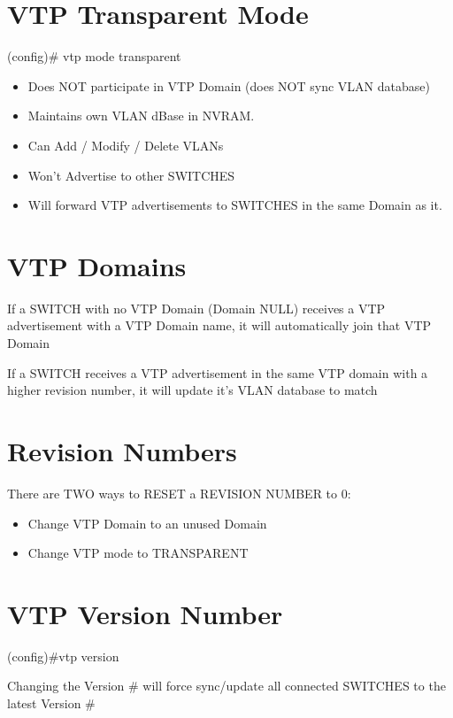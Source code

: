\section{VTP Transparent Mode}\label{vtp-transparent-mode}

\begin{tipbox}

(config)\# vtp mode transparent

\end{tipbox}

\begin{itemize}
\tightlist
\item
  Does NOT participate in VTP Domain (does NOT sync VLAN database)
\item
  Maintains own VLAN dBase in NVRAM.
\item
  Can Add / Modify / Delete VLANs
\item
  Won't Advertise to other SWITCHES
\item
  Will forward VTP advertisements to SWITCHES in the same Domain as it.
\end{itemize}

\section{VTP Domains}\label{vtp-domains}

If a SWITCH with no VTP Domain (Domain NULL) receives a VTP
advertisement with a VTP Domain name, it will automatically join that
VTP Domain

If a SWITCH receives a VTP advertisement in the same VTP domain with a
higher revision number, it will update it's VLAN database to match

\section{Revision Numbers}\label{revision-numbers}

There are TWO ways to RESET a REVISION NUMBER to 0:

\begin{itemize}
\tightlist
\item
  Change VTP Domain to an unused Domain
\item
  Change VTP mode to TRANSPARENT
\end{itemize}

\section{VTP Version Number}\label{vtp-version-number}

\begin{tipbox}

(config)\#vtp version

\end{tipbox}

Changing the Version \# will force sync/update all connected SWITCHES to
the latest Version \#

